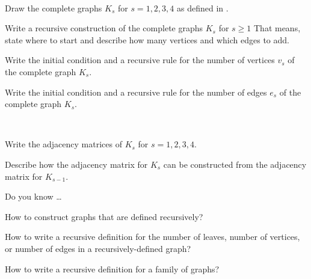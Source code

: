 \begin{exer}[\exerU] %
\label{exer_rec_defn_complete_graphs}
~
    \begin{exerpart}
        \item Draw the complete graphs $K_s$ for $s = 1, 2,3,4$ as defined in .
        \item Write a recursive construction of the complete graphs $K_s$ for $s \ge 1$   That means, state where to start and describe how many vertices and which edges to add.
        \item Write the initial condition and a recursive rule for the number of vertices $v_s$ of the complete graph $K_s$.
        \item Write the initial condition and a recursive rule for the number of edges $e_s$ of the complete graph $K_s$.
    \end{exerpart}
\end{exer}

\begin{exer}[\exerU] %
\label{exer_rec_defn_adj_mat_complete_graphs}
~
    \begin{exerpart}
        \item Write the adjacency matrices of $K_s$ for $s = 1,2,3,4$.
        \item Describe how the adjacency matrix for $K_s$ can be constructed from the adjacency matrix for $K_{s-1}$.
    \end{exerpart}
\end{exer}

\begin{exer}[\exerR] %
\label{exer_dyk_rec_def_graphs}
    Do you know \ldots
        \begin{exerpart}
            \item How to construct graphs that are defined recursively?
            \item How to write a recursive definition for the number of leaves, number of vertices, or number of edges in a recursively-defined graph?
            \item How to write a recursive definition for a family of graphs?
        \end{exerpart}
\end{exer}

